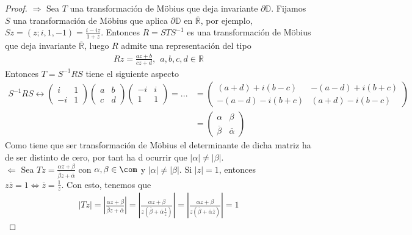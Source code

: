 \begin{proof}
$\Longrightarrow$ Sea $T$ una transformación de M\"obius que deja invariante $\partial \mathbb{D}$. Fijamos $S$ una transformación de M\"obius que aplica $\partial \mathbb{D}$ en $\overline{\mathbb{R}}$, por ejemplo, $Sz = (z;i,1,-1) = \frac{i -iz}{1+z}$. Entonces $R = STS^{-1}$ es una transformación de M\"obius que deja invariante $\overline{\mathbb{R}}$, luego $R$ admite una representación del tipo
\begin{align*}
    Rz = \frac{az + b}{cz + d}, \ \ a,b,c,d \in \mathbb{R}
\end{align*}
Entonces $T = S^{-1}RS$ tiene el siguiente aspecto
\begin{align*}
    S^{-1}RS \longleftrightarrow \begin{pmatrix}
            i & 1 \\
            -i & 1
        \end{pmatrix} \begin{pmatrix}
            a & b \\
            c & d
        \end{pmatrix} \begin{pmatrix}
            -i & i \\
            1 & 1
        \end{pmatrix} = ... &= \begin{pmatrix}
            (a+d) + i(b-c) & -(a-d) + i(b+c) \\
            -(a-d) - i(b+c) & (a+d) - i(b-c)
        \end{pmatrix} \\
        &= \begin{pmatrix}
            \alpha & \beta \\
            \overline{\beta} & \overline{\alpha}
        \end{pmatrix}
\end{align*}
Como tiene que ser transformación de M\"obius el determinante de dicha matriz ha de ser distinto de cero, por tant ha d ocurrir que $|\alpha| \not = |\beta|$.
\\
\newline
$\Longleftarrow$ Sea $Tz = \frac{\alpha z + \beta}{\overline{\beta}z + \overline{\alpha}}$ con $\alpha,\beta \in \com$ y $|\alpha| \not = |\beta|$. Si $|z| = 1$, entonces $z\overline{z} = 1 \Longleftrightarrow \overline{z} = \frac{1}{z}$. Con esto, tenemos que
\begin{align*}
    |Tz| = \left| \frac{\alpha z + \beta}{\overline{\beta} z + \overline{\alpha}} \right| = \left| \frac{\alpha z + \beta}{z\left(\overline{\beta} + \overline{\alpha}\frac{1}{\overline{z}}\right)} \right| = \left| \frac{\alpha z + \beta}{z\left(\overline{\beta} + \overline{\alpha}\overline{z}\right)} \right| = 1
\end{align*}
\end{proof}

